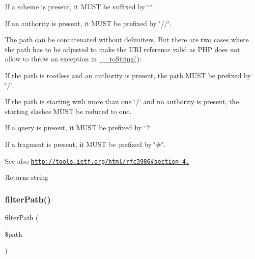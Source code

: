 \begin{DoxyItemize}
\item If a scheme is present, it M\+U\+ST be suffixed by \char`\"{}\+:\char`\"{}.
\item If an authority is present, it M\+U\+ST be prefixed by \char`\"{}//\char`\"{}.
\item The path can be concatenated without delimiters. But there are two cases where the path has to be adjusted to make the U\+RI reference valid as P\+HP does not allow to throw an exception in \mbox{\hyperlink{class_pes_1_1_http_1_1_uri_a7516ca30af0db3cdbf9a7739b48ce91d}{\+\_\+\+\_\+to\+String()}}\+:
\begin{DoxyItemize}
\item If the path is rootless and an authority is present, the path M\+U\+ST be prefixed by \char`\"{}/\char`\"{}.
\item If the path is starting with more than one \char`\"{}/\char`\"{} and no authority is present, the starting slashes M\+U\+ST be reduced to one.
\end{DoxyItemize}
\item If a query is present, it M\+U\+ST be prefixed by \char`\"{}?\char`\"{}.
\item If a fragment is present, it M\+U\+ST be prefixed by \char`\"{}\#\char`\"{}.
\end{DoxyItemize}

\begin{DoxySeeAlso}{See also}
\href{http://tools.ietf.org/html/rfc3986#section-4.1}{\tt http\+://tools.\+ietf.\+org/html/rfc3986\#section-\/4.} 
\end{DoxySeeAlso}
\begin{DoxyReturn}{Returns}
string 
\end{DoxyReturn}
\mbox{\label{class_pes_1_1_http_1_1_uri_a8568e8e83e03e368b21b85bd148c0cdd}} 
\subsubsection{\texorpdfstring{filter\+Path()}{filterPath()}}
{\footnotesize\ttfamily filter\+Path (\begin{DoxyParamCaption}\item[{}]{\$path }\end{DoxyParamCaption})\hspace{0.3cm}{\ttfamily [protected]}}

